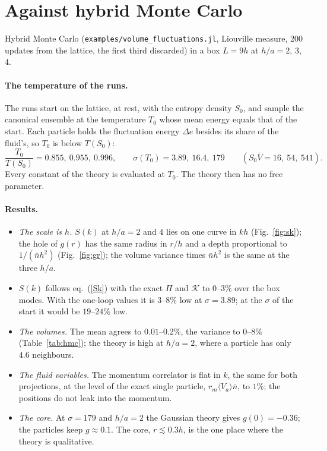\documentclass[11pt,aps,preprint,nofootinbib,superscriptaddress,tightenlines]{revtex4-2}
\newcommand{\avg}[1]{\langle #1\rangle}
\def\st{\begin{equation}}
\def\stp{\end{equation}}
\def\Eq#1{eq.~(\ref{#1})}
\def\Fig#1{Fig.~\ref{#1}}
\let\oldparagraph\paragraph
\renewcommand{\paragraph}{\par\bigskip\oldparagraph}
\begin{document}
\section{Against hybrid Monte Carlo}
\label{sec:hmc}

Hybrid Monte Carlo (\texttt{examples/volume\_fluctuations.jl}, Liouville measure, 200 updates from the lattice, the first third discarded) in a box $L=9h$ at
$h/a=2$, $3$, $4$.

\paragraph{The temperature of the runs.}  The runs start on the lattice, at rest, with the entropy density $S_0$, and sample the canonical ensemble at the
temperature $T_0$ whose mean energy equals that of the start.  Each particle holds the fluctuation energy $\Delta e$ besides its share of the fluid's, so
$T_0$ is below $T(S_0)$:
\st
\frac{T_0}{T(S_0)}=0.855,\ 0.955,\ 0.996,\qquad \sigma(T_0)=3.89,\ 16.4,\ 179\qquad(S_0\bar V=16,\ 54,\ 541) .
\stp
Every constant of the theory is evaluated at $T_0$.  The theory then has no free parameter.

\paragraph{Results.}
\begin{itemize}
\item \emph{The scale is $h$.}  $S(k)$ at $h/a=2$ and $4$ lies on one curve in $kh$ (\Fig{fig:sk}); the hole of $g(r)$ has the same radius in $r/h$ and a
  depth proportional to $1/(\bar nh^2)$ (\Fig{fig:gr}); the volume variance times $\bar nh^2$ is the same at the three $h/a$.
\item \emph{$S(k)$} follows \Eq{Sk} with the exact $\Pi$ and $\mathcal K$ to $0$--$3\%$ over the box modes.  With the one-loop values it is $3$--$8\%$ low at
  $\sigma=3.89$; at the $\sigma$ of the start it would be $19$--$24\%$ low.
\item \emph{The volumes.}  The mean agrees to $0.01$--$0.2\%$, the variance to $0$--$8\%$ (Table~\ref{tab:hmc}); the theory is high at $h/a=2$, where a particle has
  only $4.6$ neighbours.
\item \emph{The fluid variables.}  The momentum correlator is flat in $k$, the same for both projections, at the level of the exact single particle,
  $r_m\avg{V_a}\bar n$, to $1\%$; the positions do not leak into the momentum.
\item \emph{The core.}  At $\sigma=179$ and $h/a=2$ the Gaussian theory gives $g(0)=-0.36$; the particles keep $g\approx0.1$.  The core, $r\lesssim0.3h$, is the one
  place where the theory is qualitative.
\end{itemize}
\end{document}
